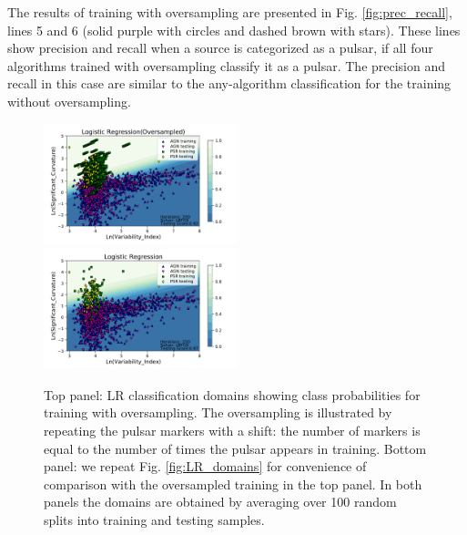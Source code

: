 The results of training with oversampling are presented  in Fig. \ref{fig:prec_recall},
lines 5 and 6 (solid purple with circles and dashed brown with stars). 
These lines show precision and recall when a source is categorized as a pulsar, if all four algorithms trained with oversampling classify it as a pulsar. 
The precision and recall in this case are similar to the any-algorithm classification for the training without oversampling.


\begin{figure}[h]
\centering
\includegraphics[width=0.5\textwidth]{plots/classification_domains/lr_200_lbfgs_oversample.pdf} \\
\includegraphics[width=0.5\textwidth]{plots/classification_domains/lr_200_lbfgs.pdf}
\caption{Top panel: LR classification domains showing class probabilities for training with oversampling.
The oversampling is illustrated by repeating the pulsar markers with a shift: the number of markers is equal to the number of times the pulsar appears in training.
Bottom panel: we repeat Fig. \ref{fig:LR_domains} for convenience of comparison with the oversampled training in the top panel.
In both panels the domains are obtained by averaging over 100 random splits into training and testing samples.
}  
\label{fig:LR_domains_O}
\end{figure}
